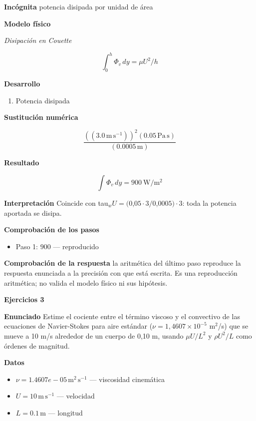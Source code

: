 \documentclass[10pt,openany]{book}
\begin{document}
\noindent\textbf{Incógnita}
potencia disipada por unidad de área

\noindent\textbf{Modelo físico}

\noindent\textit{Disipación en Couette}

\[
\int_0^{h}\Phi_v\,dy = \mu U^{2}/h
\]

\noindent\textbf{Desarrollo}
\begin{enumerate}
\item
Potencia disipada
\end{enumerate}

\noindent\textbf{Sustitución numérica}

\[
\frac{\left(\left(3.0\,\mathrm{m}\,\mathrm{s}^{-1}\right)\right)^{2} \left(0.05\,\mathrm{Pa}\,\mathrm{s}\right)}{\left(0.0005\,\mathrm{m}\right)}
\]

\noindent\textbf{Resultado}

\[
\int\Phi_v\,dy = 900\ \mathrm{W/m^{2}}
\]

\noindent\textbf{Interpretación}
Coincide con tau\(_w U = (0\),\(05\cdot3/0\),\(0005)\cdot3\): toda la potencia aportada se disipa.

\noindent\textbf{Comprobación de los pasos}
\begin{itemize}
\item Paso 1: $900$ — reproducido
\end{itemize}

\noindent\textbf{Comprobación de la respuesta} la aritmética del último paso reproduce la respuesta enunciada a la precisión con que está escrita. Es una reproducción aritmética; no valida el modelo físico ni sus hipótesis.

\noindent\textbf{Ejercicios 3}

\noindent\textbf{Enunciado}
Estime el cociente entre el término viscoso y el convectivo de las ecuaciones de Navier-Stokes para aire estándar (\(\nu = 1{,}4607\times 10^{-5}\) m\(^2\)/s) que se mueve a 10 m/s alrededor de un cuerpo de 0,10 m, usando \(\mu U/L^{2}\) y \(\rho U^{2}/L\) como órdenes de magnitud.

\noindent\textbf{Datos}
\begin{itemize}
\item $\nu = 1.4607e-05\,\mathrm{m}^{2}\,\mathrm{s}^{-1}$ — viscosidad cinemática
\item $U = 10\,\mathrm{m}\,\mathrm{s}^{-1}$ — velocidad
\item $L = 0.1\,\mathrm{m}$ — longitud
\end{itemize}
\end{document}
